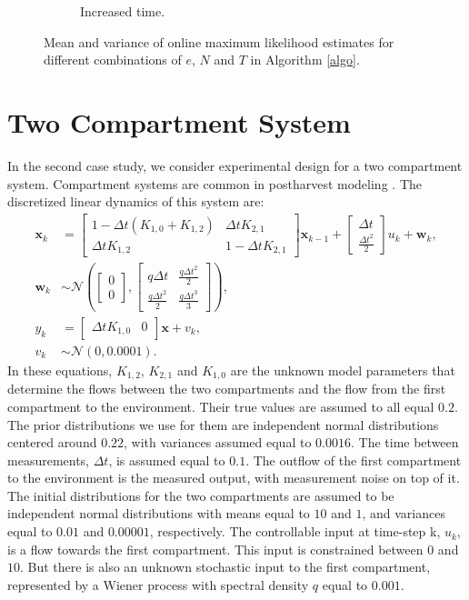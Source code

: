 \begin{figure}[H]
\begin{subfigure}[b]{0.45\textwidth}
		\caption{Increased time.}
		\label{figEnsembleIncrTime}
	\end{subfigure}
	\caption{Mean and variance of online maximum likelihood estimates for different combinations of $e$, $N$ and $T$ in Algorithm \ref{algo}.} 
	\label{fig:analysis}
\end{figure}
\section{Two Compartment System}
In the second case study, we consider experimental design for a two compartment system. Compartment systems are common in postharvest modeling \parencite{lechaudel,yoneyama}. The discretized linear dynamics of this system are:
\begin{equation}
\begin{aligned}
\bm x_k &= \begin{bmatrix}
1 - \Delta t(K_{1,0} + K_{1,2})  & \Delta tK_{2,1}\\
\Delta tK_{1,2} & 1 - \Delta tK_{2,1}
\end{bmatrix} \bm x_{k-1} +
\begin{bmatrix} \Delta t \\ \frac{\Delta t^2}{2}\end{bmatrix} u_k + 
\bm w_k,\\
\bm w_k & \sim  \mathcal{N}\left(\begin{bmatrix}0\\0\end{bmatrix},
\begin{bmatrix} q \Delta t & \frac{q\Delta t^2}{2} \\\frac{q\Delta t^2}{2}  &\frac{q\Delta t^3}{3} \end{bmatrix}\right),\\
y_k &= \begin{bmatrix} \Delta tK_{1,0} & 0 \end{bmatrix} \bm x + v_k, \\
v_k &\sim \mathcal{N}(0,0.0001).
\end{aligned}
\end{equation}
In these equations, $K_{1,2}$, $K_{2,1}$ and $K_{1,0}$ are the unknown model parameters that determine the flows between the two compartments and the flow from the first compartment to the environment. Their true values are assumed to all equal $0.2$. The prior distributions we use for them are independent normal distributions centered around $0.22$, with variances assumed equal to $0.0016$. The time between measurements, $\Delta t$, is assumed equal to $0.1$. The outflow of the first compartment to the environment is the measured output, with measurement noise on top of it. The initial distributions for the two compartments are assumed to be independent normal distributions with means equal to $10$ and $1$, and variances equal to $0.01$ and $0.00001$, respectively. The controllable input at time-step k, $u_k$, is a flow towards the first compartment. This input is constrained between $0$ and $10$. But there is also an unknown stochastic input to the first compartment, represented by a Wiener process with spectral density $q$ equal to $0.001$.
